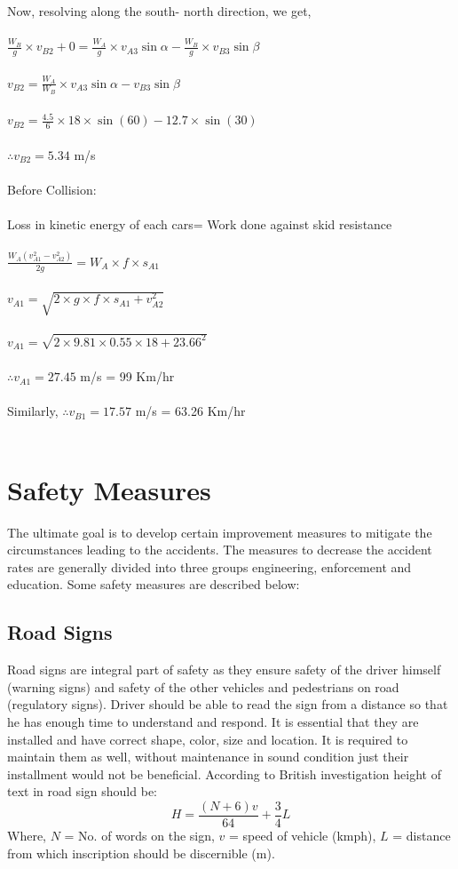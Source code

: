 Now, resolving along the south- north direction, we get,\\\\
$ \frac{W_B}{g} \times v_{B2} + 0 = \frac{W_A}{g} \times v_{A3} \sin \alpha - \frac{W_B}{g} \times v_{B3} \sin \beta$\\\\
$ v_{B2} = \frac{W_A}{W_B} \times v_{A3} \sin \alpha - v_{B3} \sin \beta $\\\\
$ v_{B2} = \frac{4.5}{6} \times 18 \times \sin(60) - 12.7 \times \sin(30) $\\\\
$ \therefore v_{B2} = 5.34 $ m/s\\\\
Before Collision:\\\\
Loss in kinetic energy of each cars= Work done against skid resistance\\\\
$ \frac{W_A (v_{A1}^2 - v_{A2}^2)}{2g}  = W_A \times f \times s_{A1} $\\\\
$ v_{A1} = \sqrt{2 \times g \times f \times s_{A1} + v_{A2}^2}$\\\\
$ v_{A1} = \sqrt{2 \times 9.81 \times 0.55 \times 18 + 23.66^2}$\\\\
$ \therefore v_{A1} = 27.45 $ m/s = 99 Km/hr\\\\
Similarly,
$ \therefore v_{B1} = 17.57 $ m/s = 63.26 Km/hr\\\\
\section{Safety Measures}
The ultimate goal is to develop certain improvement measures to mitigate the circumstances leading to the accidents. The measures to decrease the accident rates are generally divided into three groups engineering, enforcement and education. Some safety measures are described below:
\subsection{Road Signs}
Road signs are integral part of safety as they ensure safety of the driver himself (warning signs) and safety of the other vehicles and pedestrians on road (regulatory signs). Driver should be able to read the sign from a distance so that he has enough time to understand and respond. It is essential that they are installed and have correct shape, color, size and location. It is required to maintain them as well, without maintenance in sound condition just their installment would not be beneficial. According to British investigation height of text in road sign should be:
\begin{equation}
	H = \frac{(N + 6) v}{64} + \frac{3}{4} L
\end{equation}
Where, $ N $ = No. of words on the sign, $ v $ = speed of vehicle (kmph), $ L $ = distance from which inscription should be discernible (m).
